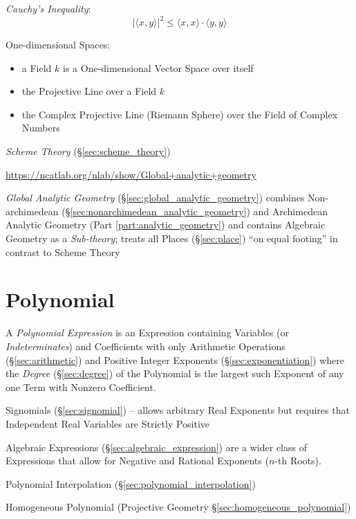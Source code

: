 \emph{Cauchy's Inequality}:
\[
    |\langle x,y \rangle|^2 \leq \langle x,x \rangle \cdot \langle
    y,y \rangle
\]

One-dimensional Spaces:
\begin{itemize}
\item a Field $k$ is a One-dimensional Vector Space over itself
\item the Projective Line over a Field $k$
\item the Complex Projective Line (Riemann Sphere) over the Field of Complex
  Numbers
\end{itemize}

\emph{Scheme Theory} (\S\ref{sec:scheme_theory})

\url{https://ncatlab.org/nlab/show/Global+analytic+geometry}

\emph{Global Analytic Geometry} (\S\ref{sec:global_analytic_geometry}) combines
Non-archimedean (\S\ref{sec:nonarchimedean_analytic_geometry}) and Archimedean
Analytic Geometry (Part \ref{part:analytic_geometry}) and contains Algebraic
Geometry as a \emph{Sub-theory}; treats all Places (\S\ref{sec:place}) ``on
equal footing'' in contrast to Scheme Theory



\section{Polynomial}\label{sec:polynomial}

A \emph{Polynomial Expression} is an Expression containing Variables (or
\emph{Indeterminates}) and Coefficients with only Arithmetic Operations
(\S\ref{sec:arithmetic}) and Positive Integer Exponents
(\S\ref{sec:exponentiation}) where the \emph{Degree} (\S\ref{sec:degree}) of
the Polynomial is the largest such Exponent of any one Term with Nonzero
Coefficient.

\fist Signomials (\S\ref{sec:signomial}) -- allows arbitrary Real Exponents but
requires that Independent Real Variables are Strictly Positive

\fist Algebraic Expressions (\S\ref{sec:algebraic_expression}) are a wider
class of Expressions that allow for Negative and Rational Exponents ($n$-th
Roots).

\fist Polynomial Interpolation (\S\ref{sec:polynomial_interpolation})

\fist Homogeneous Polynomial (Projective Geometry
\S\ref{sec:homogeneous_polynomial})

